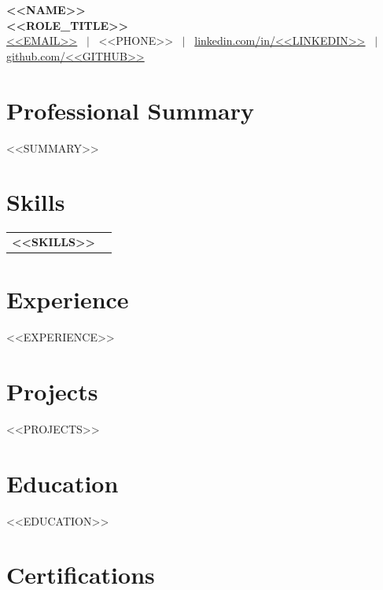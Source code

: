 \documentclass[a4paper,10pt]{article}
\begin{document}
\pagestyle{empty}

\noindent
{\centering
{\LARGE \textbf{<<NAME>>}}\\[3pt]
\textbf{ <<ROLE_TITLE>> }\\[3pt]
\href{mailto:<<EMAIL>>}{<<EMAIL>>}
~$|$~
<<PHONE>>
~$|$~
\href{https://linkedin.com/in/<<LINKEDIN>>}{linkedin.com/in/<<LINKEDIN>>}
~$|$~
\href{https://github.com/<<GITHUB>>}{github.com/<<GITHUB>>}\par
}

\vspace{3pt}

\section*{Professional Summary}
<<SUMMARY>>

\section*{Skills}

\renewcommand{\arraystretch}{1.0}
\begin{tabular}{@{} >{\bfseries}p{3.8cm} p{13cm} @{} }
<<SKILLS>>
\end{tabular}

\section*{Experience}
<<EXPERIENCE>>

\section*{Projects}

<<PROJECTS>>

\section*{Education}
<<EDUCATION>>

\section*{Certifications}
\end{document}
